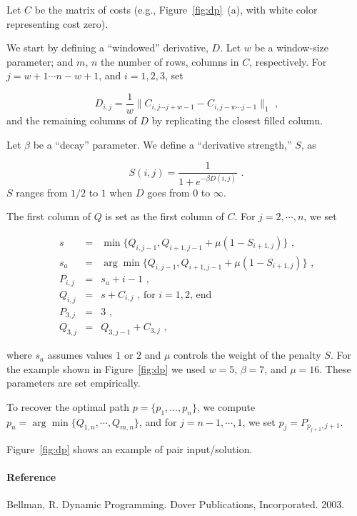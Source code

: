 \documentclass[a4paper,twoside]{article}
\begin{document}
Let $C$ be the matrix of costs (e.g., Figure~\ref{fig:dp}~(a), with white color
representing cost zero).

We start by defining a ``windowed'' derivative, $D$.
Let $w$ be a window-size parameter; and $m$, $n$ the number of rows, columns in $C$,
respectively. For $j = w+1 \cdots n-w+1$, and $i = 1,2,3$,
set

$$D_{i,j} =  \frac{1}{w} \| C_{i,j \cdots j+w-1}-C_{i,j-w \cdots j-1} \|_1\text{ ,}$$
and the remaining columns of $D$ by replicating the closest filled column.

Let $\beta$ be a ``decay'' parameter. We define a ``derivative strength,'' $S$,
as

$$S(i,j) = \frac{1}{1+e^{-\beta D(i,j)}}\text{ .}$$
$S$ ranges from $1/2$ to $1$ when $D$ goes from $0$ to $\infty$.

The first column of $Q$ is set as the first column of $C$.
For $j = 2,\cdots,n$, we set

\vspace{-0.5cm}
\begin{eqnarray*}
s &=& \min \{ Q_{i,j-1}, Q_{i+1,j-1}+ \mu (1-S_{i+1,j}) \}\text{ ,}\\
s_a &=& \arg \min \{ Q_{i,j-1}, Q_{i+1,j-1}+ \mu (1-S_{i+1,j}) \}\text{ ,}\\
P_{i,j} &=& s_a+i-1 \text{ ,}\\
Q_{i,j} &=& s+C_{i,j}\text{ , for } i = 1,2\text{, end}\\
P_{3,j} &=& 3\text{ ,}\\
Q_{3,j} &=& Q_{3,j-1} + C_{3,j}\text{ ,}
\end{eqnarray*}

\noindent
where $s_a$ assumes values $1$ or $2$ and $\mu$ controls the
weight of the penalty $S$.
For the example shown in Figure~\ref{fig:dp} we used $w = 5$, $\beta = 7$,
and $\mu = 16$. These parameters are set empirically.

To recover the optimal path $p = \{p_1,...,p_n\}$, we compute
$p_n = \arg \min \{ Q_{1,n}, \cdots, Q_{m,n}\}$, and for
$j = n-1,\cdots,1$, we set $p_j = P_{p_{j+1},j+1}$.

Figure~\ref{fig:dp} shows an example of pair input/solution.

\paragraph{Reference}
Bellman, R. Dynamic Programming. Dover Publications, Incorporated. 2003.
\end{document}
